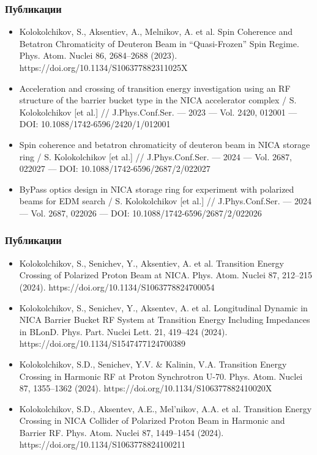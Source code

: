 \begin{frame}
	\frametitle{Публикации}
	\small
	\begin{itemize}
		\item	Kolokolchikov, S., Aksentiev, A., Melnikov, A. et al. Spin Coherence and Betatron Chromaticity of Deuteron Beam in “Quasi-Frozen” Spin Regime. Phys. Atom. Nuclei 86, 2684–2688 (2023). https://doi.org/10.1134/S106377882311025X
		\item	Acceleration and crossing of transition energy investigation using an RF structure of the barrier bucket type in the NICA accelerator complex / S. Kolokolchikov [et al.] // J.Phys.Conf.Ser. — 2023 — Vol. 2420, 012001 — DOI: 10.1088/1742-6596/2420/1/012001
		\item	Spin coherence and betatron chromaticity of deuteron beam in NICA storage ring / S. Kolokolchikov [et al.] // J.Phys.Conf.Ser. — 2024 — Vol. 2687, 022027 — DOI: 10.1088/1742-6596/2687/2/022027
		\item	ByPass optics design in NICA storage ring for experiment with polarized beams for EDM search / S. Kolokolchikov [et al.] // J.Phys.Conf.Ser. — 2024 — Vol. 2687, 022026 — DOI: 10.1088/1742-6596/2687/2/022026
	\end{itemize}
\end{frame}
\begin{frame}
	\frametitle{Публикации}
	\small
	\begin{itemize}
		\item	Kolokolchikov, S., Senichev, Y., Aksentiev, A. et al. Transition Energy Crossing of Polarized Proton Beam at NICA. Phys. Atom. Nuclei 87, 212–215 (2024). https://doi.org/10.1134/S1063778824700054
		\item	Kolokolchikov, S., Senichev, Y., Aksentev, A. et al. Longitudinal Dynamic in NICA Barrier Bucket RF System at Transition Energy Including Impedances in BLonD. Phys. Part. Nuclei Lett. 21, 419–424 (2024). https://doi.org/10.1134/S1547477124700389
		\item	Kolokolchikov, S.D., Senichev, Y.V. \& Kalinin, V.A. Transition Energy Crossing in Harmonic RF at Proton Synchrotron U-70. Phys. Atom. Nuclei 87, 1355–1362 (2024). https://doi.org/10.1134/S106377882410020X
		\item	Kolokolchikov, S.D., Aksentev, A.E., Mel’nikov, A.A. et al. Transition Energy Crossing in NICA Collider of Polarized Proton Beam in Harmonic and Barrier RF. Phys. Atom. Nuclei 87, 1449–1454 (2024). https://doi.org/10.1134/S1063778824100211
	\end{itemize}
\end{frame}


